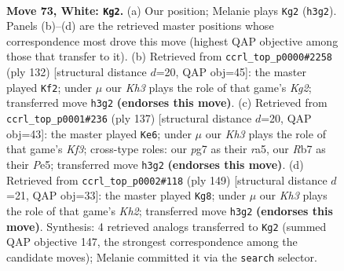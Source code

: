 \documentclass[11pt]{article}
\begin{document}
\clearpage

\begin{figure}[p]\centering
\begin{subfigure}{0.46\textwidth}\centering
\resizebox{\linewidth}{!}{%
\newchessgame
\chessboard[
  setfen={6k1/1R4p1/2N2p2/7p/3P3P/3r2PK/8/8 w - - 39 73},
  showmover=false,
  pgfstyle=straightmove, color=movearrow, markmove={h3-g2}
]}
\caption{}
\end{subfigure}\hfill
\begin{subfigure}{0.46\textwidth}\centering
\resizebox{\linewidth}{!}{%
\newchessgame
\chessboard[
  setfen={8/8/R3pk2/6p1/5pP1/5P2/1r2P1K1/8 w - - 34 67},
  showmover=false,
  pgfstyle=straightmove, color=movearrow, markmove={g2-f2}
]}
\caption{}
\end{subfigure}
\\[4pt]
\begin{subfigure}{0.46\textwidth}\centering
\resizebox{\linewidth}{!}{%
\newchessgame
\chessboard[
  setfen={8/8/5kp1/R3p2p/4P2P/5P2/4r1PK/8 b - - 58 69},
  showmover=false,
  pgfstyle=straightmove, color=movearrow, markmove={f6-e6}
]}
\caption{}
\end{subfigure}\hfill
\begin{subfigure}{0.46\textwidth}\centering
\resizebox{\linewidth}{!}{%
\newchessgame
\chessboard[
  setfen={8/2R3pk/7p/7P/1r4P1/6K1/8/8 b - - 2 75},
  showmover=false,
  pgfstyle=straightmove, color=movearrow, markmove={h7-g8}
]}
\caption{}
\end{subfigure}
\caption{\textbf{Move 73, White: \texttt{Kg2}.} (a) Our position; Melanie plays \texttt{Kg2} (\texttt{h3g2}). Panels (b)--(d) are the retrieved master positions whose correspondence most drove this move (highest QAP objective among those that transfer to it). (b) Retrieved from \texttt{ccrl\_top\_p0000\#2258} (ply 132) [structural distance $d$=20, QAP obj=45]: the master played \texttt{Kf2}; under $\mu$ our \emph{Kh3} plays the role of that game's \emph{Kg2}; transferred move \texttt{h3g2} \textbf{(endorses this move)}. (c) Retrieved from \texttt{ccrl\_top\_p0001\#236} (ply 137) [structural distance $d$=20, QAP obj=43]: the master played \texttt{Ke6}; under $\mu$ our \emph{Kh3} plays the role of that game's \emph{Kf3}; cross-type roles: our \emph{p}g7 as their \emph{r}a5, our \emph{R}b7 as their \emph{P}e5; transferred move \texttt{h3g2} \textbf{(endorses this move)}. (d) Retrieved from \texttt{ccrl\_top\_p0002\#118} (ply 149) [structural distance $d$=21, QAP obj=33]: the master played \texttt{Kg8}; under $\mu$ our \emph{Kh3} plays the role of that game's \emph{Kh2}; transferred move \texttt{h3g2} \textbf{(endorses this move)}. Synthesis: 4 retrieved analogs transferred to \texttt{Kg2} (summed QAP objective 147, the strongest correspondence among the candidate moves); Melanie committed it via the \texttt{search} selector.}
\label{fig:thought-m144}
\end{figure}
\end{document}
